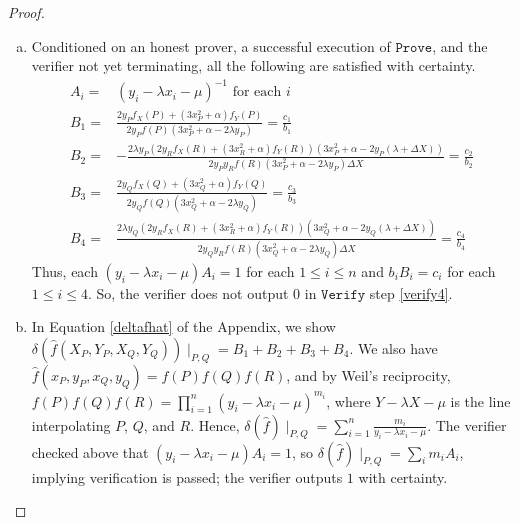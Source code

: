 \documentclass[11pt,letterpaper]{article}
\theoremstyle{definition}
\newcommand{\6}{\mathbf}
\newcommand{\7}{\mathcal}
\begin{document}
\begin{proof}
\begin{enumerate}[(a)]
\item Conditioned on an honest prover, a successful execution of $\texttt{Prove}$, and the verifier not yet terminating, all the following are satisfied with certainty.
\begin{align}
A_i =& (y_i - \lambda x_i - \mu)^{-1}\text{ for each }i \\
B_1 =& \frac{2y_P f_X(P) + (3x_P^2+\alpha)f_Y(P)}{2y_Pf(P)(3x_P^2+\alpha-2\lambda y_P)} = \frac{c_1}{b_1}\\
B_2 =& - \frac{2\lambda y_P(2y_Rf_X(R) + (3x_R^2+\alpha) f_Y(R))(3x_P^2+\alpha - 2y_P(\lambda + \Delta X))}{2y_Py_Rf(R)(3x_P^2+\alpha-2\lambda y_P)\Delta X} = \frac{c_2}{b_2} \\
B_3 =& \frac{2y_Qf_X(Q) + (3x_Q^2+\alpha) f_Y(Q)}{2y_Qf(Q)(3x_Q^2+\alpha - 2\lambda y_Q)} = \frac{c_3}{b_3} \\
B_4 =& \frac{2\lambda y_Q(2y_Rf_X(R) + (3x_R^2+\alpha)f_Y(R))(3x_Q^2+\alpha - 2y_Q(\lambda + \Delta X))}{2y_Qy_Rf(R)(3x_Q^2+\alpha  - 2\lambda y_Q) \Delta X} = \frac{c_4}{b_4}
\end{align}
Thus, each $(y_i - \lambda x_i - \mu)A_i = 1$ for each $1 \leq i \leq n$ and $b_i B_i = c_i$ for each $1 \leq i \leq 4$. So, the verifier does not output $0$ in $\texttt{Verify}$ step \ref{verify4}.

\item In Equation \ref{deltafhat} of the Appendix, we show $\delta(\widehat{f}(X_P,Y_P,X_Q,Y_Q))\mid_{P,Q} = B_1 + B_2 + B_3 + B_4$.   We also have $\widehat{f}(x_P,y_P,x_Q,y_Q) = f(P)f(Q)f(R)$, and by Weil's reciprocity, $f(P)f(Q)f(R) = \prod_{i=1}^{n} (y_i - \lambda x_i - \mu)^{m_i}$, where $Y - \lambda X - \mu$ is the line interpolating $P$, $Q$, and $R$. Hence, $\delta(\widehat{f})\mid_{P,Q} = \sum_{i=1}^{n} \frac{m_i}{y_i-\lambda x_i - \mu}$. The verifier checked above that $(y_i-\lambda x_i - \mu)A_i = 1$, so $\delta(\widehat{f})\mid_{P,Q} = \sum_i m_i A_i$, implying verification is passed; the verifier outputs $1$ with certainty.
\end{enumerate}


\end{proof}
\end{document}

